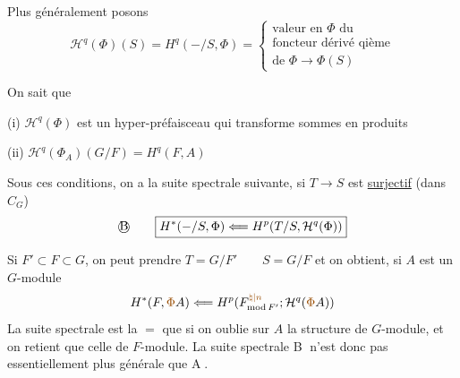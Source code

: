 Plus généralement  posons
\[
\mathcal H^q(\Phi)(S)=H^q(-/S,\Phi)=\left\{\begin{gathered}\text{valeur en }\Phi\text{ du}\\\text{foncteur dérivé qième}\\\text{de }\Phi\longrightarrow\Phi(S)\end{gathered}\right.
\]

On sait que

(i) $\mathcal H^q(\Phi)$ est un hyper-préfaisceau qui  transforme sommes  en produits

(ii) $\mathcal H^q(\Phi_A)(G/F)=H^q(F,A)$

Sous ces conditions, on a la suite spectrale suivante, si $T\longrightarrow S$ est \uline{surjectif} (dans $C_G$)
\[
\text{\textcircled{B}}\qquad\boxed{H^*(-/S,\Phi)\Longleftarrow H^p(T/S,\mathcal H^q(\Phi))}
\]

Si $F'\subset F\subset G$, on peut prendre $T=G/F'\qquad S=G/F$ et on obtient, si $A$ est un $G$-module
\[
H^*(F,\deleted{\unsure{\Phi}}A)\Longleftarrow H^p(F^{\unsure{\natural|n}}_{\mathrm{mod}\,F'};\mathcal H^q(\deleted{\unsure{\Phi}}A))
\]
La suite spectrale est la $=$ que si on oublie sur $A$ la structure de $G$-module, et on retient que celle de $F$-module. La suite spectrale \textcircled{B} n'est donc pas essentiellement plus générale que \textcircled{A}.

